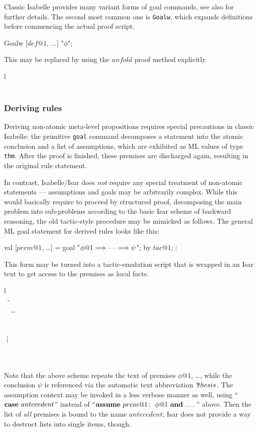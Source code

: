 \medskip Classic Isabelle provides many variant forms of goal commands, see
also \cite{isabelle-ref} for further details.  The second most common one is
\texttt{Goalw}, which expands definitions before commencing the actual proof
script.
\begin{ttbox}
 Goalw [\(def@1\), \(\dots\)] "\(\phi\)";
\end{ttbox}
This may be replaced by using the $unfold$ proof method explicitly.
\begin{matharray}{l}
 \\
\quad {} \\
\end{matharray}


\subsubsection{Deriving rules}

Deriving non-atomic meta-level propositions requires special precautions in
classic Isabelle: the primitive \texttt{goal} command decomposes a statement
into the atomic conclusion and a list of assumptions, which are exhibited as
ML values of type \texttt{thm}.  After the proof is finished, these premises
are discharged again, resulting in the original rule statement.

In contrast, Isabelle/Isar does \emph{not} require any special treatment of
non-atomic statements --- assumptions and goals may be arbitrarily complex.
While this would basically require to proceed by structured proof, decomposing
the main problem into sub-problems according to the basic Isar scheme of
backward reasoning, the old tactic-style procedure may be mimicked as follows.
The general ML goal statement for derived rules looks like this:
\begin{ttbox}
 val [\(prem@1\), \dots] = goal "\(\phi@1 \Imp \dots \Imp \psi\)";
 by \(tac@1\);
   \(\vdots\)
\end{ttbox}
This form may be turned into a tactic-emulation script that is wrapped in an
Isar text to get access to the premises as local facts.
\begin{matharray}{l}
   \\
  \PROOF{}~- \\
  \quad {}~\AND~\dots \\
  \quad {} \\
  \qquad {} \\
  \qquad\quad \vdots \\
  \qquad \DONE \\
  \QED{} \\
\end{matharray}
Note that the above scheme repeats the text of premises $\phi@1$, \dots, while
the conclusion $\psi$ is referenced via the automatic text abbreviation
${?\!thesis}$.  The assumption context may be invoked in a less verbose
manner as well, using ``${\mathord{\mathbf{case}}}~antecedent$'' instead of
``$\ASSUME{prem@1}{\phi@1}~\AND~\dots$'' above.  Then the list of \emph{all}
premises is bound to the name $antecedent$; Isar does not provide a way to
destruct lists into single items, though.

